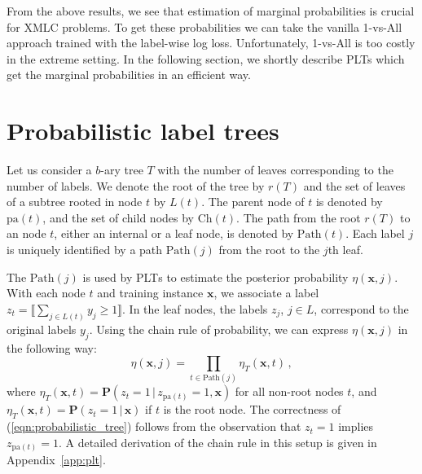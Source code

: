 \documentclass{article}
\newcommand{\Algo}[1]{\textsc{#1}}
\renewcommand{\vec}[1]{\boldsymbol{#1}}
\newcommand{\bx}{\vec{x}}
\newcommand{\pa}[1]{\mathrm{pa}(#1)}
\newcommand{\Path}[1]{\mathrm{Path}(#1)}
\newcommand{\Children}[1]{\mathrm{Ch}(#1)}
\newcommand{\prob}{\mathbf{P}}
\newcommand{\assert}[1]{\llbracket #1 \rrbracket}
\newcommand{\given}{\, | \,}
\newcommand{\sectionBefore}{-0pt}
\newcommand{\sectionAfter}{-0pt}
\begin{document}
From the above results, we see that estimation of marginal probabilities is crucial for XMLC problems. To get these probabilities we can take the vanilla 1-vs-All approach trained with the label-wise log loss. Unfortunately, 1-vs-All is too costly in the extreme setting. In the following section, we shortly describe PLTs which get the marginal probabilities in an efficient way. 


\vspace{\sectionBefore}
\section{Probabilistic label trees}
\vspace{\sectionAfter}

Let us consider a $b$-ary tree $T$ with the number of leaves corresponding to the number of labels. We denote the root of the tree by $r(T)$ and the set of leaves of a subtree rooted in node $t$ by $L(t)$. The parent node of $t$ is denoted by $\pa{t}$, and the set of child nodes by $\Children{t}$. The path from the root $r(T)$ to an node $t$, either an internal or a leaf node, is denoted by $\Path{t}$. 
%
Each label $j$ is uniquely identified by a path $\Path{j}$ from the root to the $j$\/th leaf. %

The $\Path{j}$ is used by \Algo{PLT}s to estimate the posterior probability $\eta(\bx, j)$.
With each node $t$ and training instance $\bx$, we associate a label $z_t = \assert{\textstyle \sum_{j \in L(t)} y_j \ge 1}$.
In the leaf nodes, the labels $z_j$, $j \in L$, correspond to the original labels $y_j$.
Using the chain rule of probability, we can express $\eta(\bx, j)$ in the following way:
\begin{equation}
\eta(\bx, j) = \prod_{t \in \Path{j}} \eta_T(\bx, t)\,,
\label{eqn:probabilistic_tree}
\end{equation}
where $\eta_T(\bx, t) = \prob(z_t = 1 \given z_{\pa{t}} =1, \bx)$ for all non-root nodes $t$, and $\eta_T(\bx, t) = \prob(z_t = 1 \given \bx)$ if $t$ is the root node. 
The correctness of (\ref{eqn:probabilistic_tree}) follows from the observation that $z_{t} = 1$ implies $z_{\pa{t}} = 1$. A detailed derivation of the chain rule in this setup is given in Appendix~\ref{app:plt}.
\end{document}
